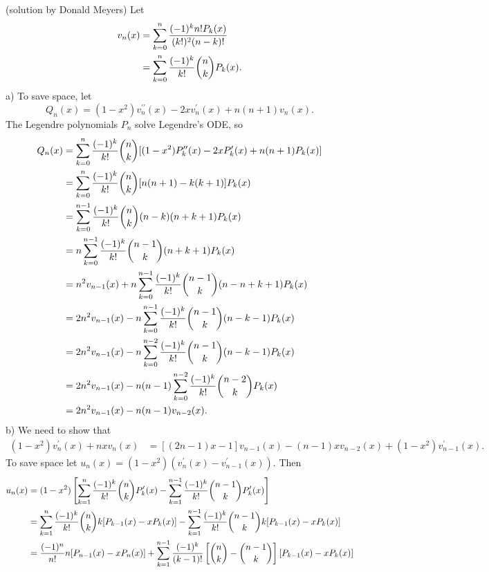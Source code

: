 \begin{solution}
(solution by Donald Meyers) Let 
\begin{align*}
v_{n}(x) & =\sum_{k=0}^{n}\frac{(-1)^{k}n!P_{k}(x)}{(k!)^{2}(n-k)!}\\
 & =\sum_{k=0}^{n}\frac{(-1)^{k}}{k!}\dbinom{n}{k}P_{k}(x).
\end{align*}
a) To save space, let 
\[
Q_{n}(x)=(1-x^{2})v_{n}^{\prime\prime}(x)-2xv_{n}^{\prime}(x)+n(n+1)v_{n}(x).
\]
The Legendre polynomials $P_{n}$ solve Legendre's ODE, so 
\begin{align*}
Q_{n}(x) & =\sum_{k=0}^{n}\frac{(-1)^{k}}{k!}\dbinom{n}{k}[(1-x^{2})P_{k}^{\prime\prime}(x)-2xP_{k}^{\prime}(x)+n(n+1)P_{k}(x)]\\
 & =\sum_{k=0}^{n}\frac{(-1)^{k}}{k!}\dbinom{n}{k}[n(n+1)-k(k+1)]P_{k}(x)\\
 & =\sum_{k=0}^{n-1}\frac{(-1)^{k}}{k!}\dbinom{n}{k}(n-k)(n+k+1)P_{k}(x)\\
 & =n\sum_{k=0}^{n-1}\frac{(-1)^{k}}{k!}\dbinom{n-1}{k}(n+k+1)P_{k}(x)\\
 & =n^{2}v_{n-1}(x)+n\sum_{k=0}^{n-1}\frac{(-1)^{k}}{k!}\dbinom{n-1}{k}(n-n+k+1)P_{k}(x)\\
 & =2n^{2}v_{n-1}(x)-n\sum_{k=0}^{n-1}\frac{(-1)^{k}}{k!}\dbinom{n-1}{k}(n-k-1)P_{k}(x)\\
 & =2n^{2}v_{n-1}(x)-n\sum_{k=0}^{n-2}\frac{(-1)^{k}}{k!}\dbinom{n-1}{k}(n-k-1)P_{k}(x)\\
 & =2n^{2}v_{n-1}(x)-n(n-1)\sum_{k=0}^{n-2}\frac{(-1)^{k}}{k!}\dbinom{n-2}{k}P_{k}(x)\\
 & =2n^{2}v_{n-1}(x)-n(n-1)v_{n-2}(x).
\end{align*}
b) We need to show that 
\begin{align*}
(1-x^{2})v_{n}^{\prime}(x)+nxv_{n}(x) & =[(2n-1)x-1]v_{n-1}(x)-(n-1)xv_{n-2}(x)+(1-x^{2})v_{n-1}^{\prime}(x).
\end{align*}
To save space let $u_{n}(x)=(1-x^{2})(v_{n}^{\prime}(x)-v_{n-1}^{\prime}(x)).$
Then 
\begin{align*}
u_{n}(x) & =(1-x^{2})\left[\sum_{k=1}^{n}\frac{(-1)^{k}}{k!}\dbinom{n}{k}P_{k}^{\prime}(x)-\sum_{k=1}^{n-1}\frac{(-1)^{k}}{k!}\dbinom{n-1}{k}P_{k}^{\prime}(x)\right]\\
 & =\sum_{k=1}^{n}\frac{(-1)^{k}}{k!}\dbinom{n}{k}k[P_{k-1}(x)-xP_{k}(x)]-\sum_{k=1}^{n-1}\frac{(-1)^{k}}{k!}\dbinom{n-1}{k}k[P_{k-1}(x)-xP_{k}(x)]\\
 & =\frac{(-1)^{n}}{n!}n[P_{n-1}(x)-xP_{n}(x)]+\sum_{k=1}^{n-1}\frac{(-1)^{k}}{(k-1)!}\left[\dbinom{n}{k}-\dbinom{n-1}{k}\right][P_{k-1}(x)-xP_{k}(x)]\\

\end{align*}
\end{solution}
